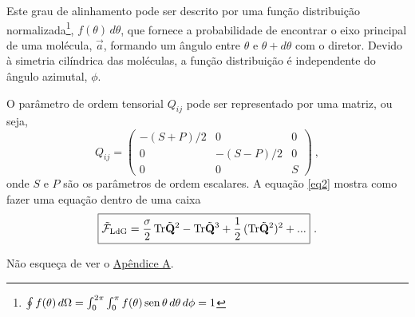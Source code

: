 Este grau de alinhamento pode ser descrito por uma função
distribuição normalizada\footnote{$\oint f(\theta)\, d\Omega =
\int_{0}^{2\pi} \int_{0}^{\pi} f(\theta)\, {\rm sen}\, \theta\,
d\theta\, d\phi = 1$}, $f(\theta)\, d\theta$, que fornece a
probabilidade de encontrar o eixo principal de uma molécula, $\vec{a}$,
formando um ângulo entre $\theta$ e $\theta + d\theta$ com o diretor.
Devido à simetria cilíndrica das moléculas, a função distribuição
é independente do ângulo azimutal, $\phi$.

O parâmetro de ordem tensorial $Q_{ij}$ pode ser representado por uma
matriz, ou seja,
\begin{equation*} 
	Q_{ij}=\left(
		\begin{array}{ccc} 
			-(S + P)/2 & 0          & 0\\ 
			0          & -(S - P)/2 & 0\\ 
			0          & 0          & S
		\end{array}\right)\ ,
\end{equation*}
onde $S$ e $P$ são os parâmetros de ordem escalares. A equação
\eqref{eq2} mostra como fazer uma equação dentro de uma caixa
\begin{equation}
	\boxed{\Tilde{\mathcal{F}}_{\rm LdG}= \frac{\sigma}{2} \, {\rm
Tr}\Tilde{\bf Q}^2 - {\rm Tr}\Tilde{\bf Q}^3 + \frac{1}{2}\, ({\rm
Tr}\Tilde{\bf Q}^2)^2 + ... }\ .
	\label{eq2}
\end{equation}

Não esqueça de ver o \hyperlink{apen}{Apêndice A}.
